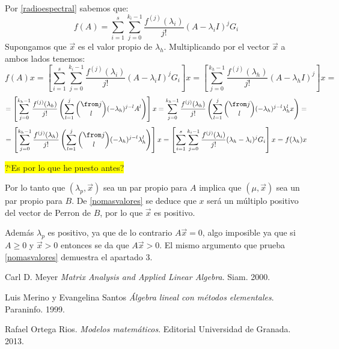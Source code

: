 \documentclass[size=a4, parskip=half, titlepage=false, toc=flat, toc=bib, 12pt]{scrartcl}
\makeatletter
\renewenvironment{proof}[1][\proofname] {\par\pushQED{\qed}\normalfont\topsep6\p@\@plus6\p@\relax\trivlist\item[\hskip\labelsep\itshape\tgpaella#1\@addpunct{.}]\ignorespaces}{\popQED\endtrivlist\@endpefalse}
\theoremstyle{theorem-style}
\theoremstyle{definition-style}
\theoremstyle{remark-style}
\theoremstyle{example-style}
\theoremstyle{definition-style}
\theoremstyle{remark-style}
\makeatother
\begin{document}
\begin{proof}
Por \ref{radioespectral} sabemos que:
$$f(A) = \sum_{i = 1}^s \sum_{j = 0}^{k_i -1} \frac{f^{(j)}(\lambda_i)}{j!} (A - \lambda_iI)^j G_i$$
Supongamos que $\vec{x}$ es el valor propio de $\lambda_h$. Multiplicando por el vector $\vec{x}$ a ambos lados tenemos:
$$f(A)x = \left[\sum_{i = 1}^s \sum_{j = 0}^{k_i -1} \frac{f^{(j)}(\lambda_i)}{j!} (A - \lambda_iI)^j G_i \right] x = \left[ \sum_{j = 0}^{k_h -1} \frac{f^{(j)}(\lambda_h)}{j!} (A - \lambda_hI)^j \right] x = $$ $$ = \left[ \sum_{j = 0}^{k_h - 1} \frac{f^{(j)}(\lambda_h)}{j!} \left( \sum_{l = 1}^j {\from j \choose l} (-\lambda_h)^{j-l} A^l \right) \right]x = \sum_{j = 0}^{k_h - 1} \frac{f^{(j)}(\lambda_h)}{j!} \left( \sum_{l = 1}^j {\from j \choose l} (-\lambda_h)^{j-l} \lambda_h^l x \right) = $$ $$=  \left[ \sum_{j = 0}^{k_h - 1} \frac{f^{(j)}(\lambda_h)}{j!} \left( \sum_{l = 1}^j {\from j \choose l} (-\lambda_h)^{j-l} \lambda_h^l \right) \right]x = \left[\sum_{i = 1}^s \sum_{j = 0}^{k_i -1} \frac{f^{(j)}(\lambda_i)}{j!} (\lambda_h - \lambda_i)^j G_i \right] x = f(\lambda_h)x $$
\begin{center} \colorbox{yellow}{?`Es por lo que he puesto antes?} \end{center}
Por lo tanto que $(\lambda_p, \vec{x})$ sea un par propio para $A$ implica que $(\mu, \vec{x})$ sea un par propio para $B$. De \ref{nomasvalores} se deduce que $x$ será un múltiplo positivo del vector de Perron de $B$, por lo que $\vec{x}$ es positivo.

Además $\lambda_p$ es positivo, ya que de lo contrario $A\vec{x} = 0$, algo imposible ya que si $A \geq 0$ y $\vec{x} > 0$ entonces se da que $A\vec{x} > 0$. El mismo argumento que prueba \ref{nomasvalores}
demuestra el apartado 3.
\end{proof}


\newpage

\begin{thebibliography}{9}
Carl D. Meyer
\textit{Matrix Analysis and Applied Linear Algebra}. Siam. 2000.

Luis Merino y Evangelina Santos
\textit{Álgebra lineal con métodos elementales}. Paraninfo. 1999.

Rafael Ortega Rios.
\textit{Modelos matemáticos}. Editorial Universidad de Granada. 2013.

\end{thebibliography}
\end{document}
